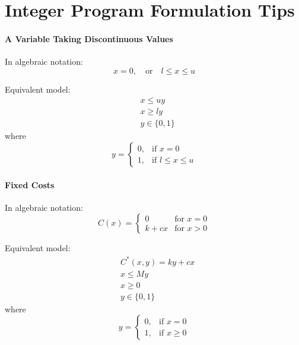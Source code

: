         \section{Integer Program Formulation Tips}
            \paragraph{A Variable Taking Discontinuous Values}
                 In algebraic notation: 
                \begin{equation*}
                    x = 0,\quad \text{or} \quad l\le x \le u 
                \end{equation*}
                
                Equivalent model:
                \begin{align*}
                    & x \le uy \\
                    & x \ge ly  \\
                    & y \in \{0, 1\} 
                \end{align*}
                where
                \begin{equation*}y=\begin{cases}0, & \text{if }x=0 \\ 1, & \text{if } l\le x \le u\end{cases} \end{equation*}
                    
            \paragraph{Fixed Costs}
                 In algebraic notation: 
                \begin{equation*}
                    C(x) = \begin{cases} 0 & \text{for } x=0 \\ k + cx & \text{for } x > 0 \end{cases} 
                \end{equation*}
                
                Equivalent model:
                \begin{align*}
                    & C^*(x, y) = ky+cx\\
                    & x \le My  \\
                    & x \ge 0 \\
                    & y \in \{0, 1\} 
                \end{align*}
                where
                \begin{equation*}y=\begin{cases}0, & \text{if }x=0 \\ 1, & \text{if }x\ge 0\end{cases} \end{equation*}
            
